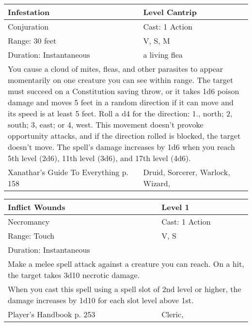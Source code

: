\documentclass[11pt]{report}
\begin{document}
\begin{table}[H]
	\begin{tabular}{||p{6cm}|p{6cm}||}
		\hline\hline
		\bf{Infestation} & Level Cantrip\\ \hline
		Conjuration & Cast: 1 Action\\ \hline
		Range: 30 feet & V, S, M\\ \hline
		Duration: Instantaneous & a living flea\\ \hline
		\multicolumn{2}{||p{12cm}||}{You cause a cloud of mites, fleas, and other parasites to appear momentarily on one creature you can see within range. The target must succeed on a Constitution saving throw, or it takes 1d6 poison damage and moves 5 feet in a random direction if it can move and its speed is at least 5 feet. Roll a d4 for the direction: 1., north; 2, south; 3, east; or 4, west. This movement doesn’t provoke opportunity attacks, and if the direction rolled is blocked, the target doesn't move.
The spell’s damage increases by 1d6 when you reach 5th level (2d6), 11th level (3d6), and 17th level (4d6).}\\ \hline
Xanathar's Guide To Everything p. 158 & Druid, Sorcerer, Warlock, Wizard, \\ \hline\hline
	\end{tabular}
\end{table}

\begin{table}[H]
	\begin{tabular}{||p{6cm}|p{6cm}||}
		\hline\hline
		\bf{Inflict Wounds} & Level 1\\ \hline
		Necromancy & Cast: 1 Action\\ \hline
		Range: Touch & V, S\\ \hline
		Duration: Instantaneous & \\ \hline
		\multicolumn{2}{||p{12cm}||}{Make a melee spell attack against a creature you can reach. On a hit, the target takes 3d10 necrotic damage.}\\ \hline
		\multicolumn{2}{||p{12cm}||}{When you cast this spell using a spell slot of 2nd level or higher, the damage increases by 1d10 for each slot level above 1st.}\\ \hline
Player's Handbook p. 253 & Cleric, \\ \hline\hline
	\end{tabular}
\end{table}
\end{document}

